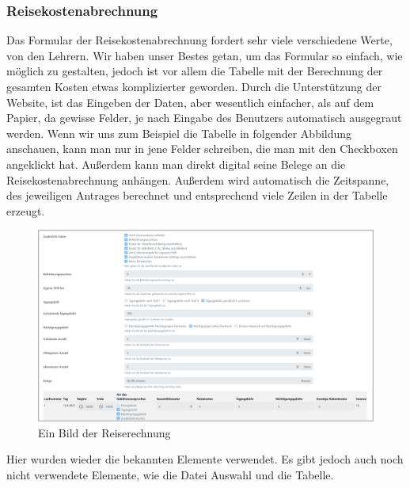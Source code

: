 \subsubsection{Reisekostenabrechnung}
Das Formular der Reisekostenabrechnung fordert sehr viele verschiedene Werte, von den Lehrern. Wir haben unser Bestes getan, um das Formular so einfach, wie möglich zu gestalten, jedoch ist vor allem die Tabelle mit der Berechnung der gesamten Kosten etwas komplizierter geworden. Durch die Unterstützung der Website, ist das Eingeben der Daten, aber wesentlich einfacher, als auf dem Papier, da gewisse Felder, je nach Eingabe des Benutzers automatisch ausgegraut werden. Wenn wir uns zum Beispiel die Tabelle in folgender Abbildung anschauen, kann man nur in jene Felder schreiben, die man mit den Checkboxen angeklickt hat. Außerdem kann man direkt digital seine Belege an die Reisekostenabrechnung anhängen. Außerdem wird automatisch die Zeitspanne, des jeweiligen Antrages berechnet und entsprechend viele Zeilen in der Tabelle erzeugt.
\begin{figure}[H]
	\centering
	\includegraphics[width=1\linewidth]{images/website/reiserechnung_1}
	\caption[Neuer Schulantrag]{Ein Bild der Reiserechnung}
	\label{fig:reiserechnungsite}
\end{figure}
Hier wurden wieder die bekannten Elemente verwendet. Es gibt jedoch auch noch nicht verwendete Elemente, wie die Datei Auswahl und die Tabelle.
